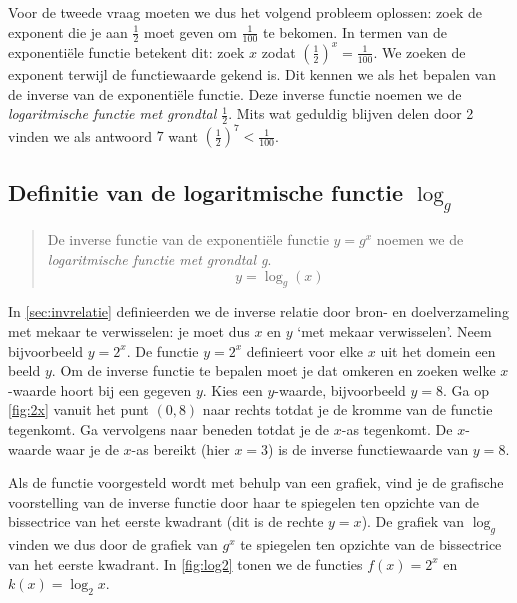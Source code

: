 Voor de  tweede vraag moeten we dus het volgend probleem oplossen: zoek de
exponent die je aan $\frac{1}{2}$ moet geven om $\frac{1}{100}$ te
bekomen. In termen van de exponenti\"{e}le functie betekent dit:
zoek $x$ zodat $\left(\frac{1}{2}\right)^{x}=\frac{1}{100}$. We zoeken de exponent terwijl de functiewaarde gekend is. Dit
kennen we als het bepalen van de inverse van de exponenti\"{e}le functie. Deze inverse
functie noemen we de \emph{logaritmische functie met grondtal
$\frac{1}{2}$}. Mits wat geduldig blijven delen door 2 vinden we als
antwoord $7$ want $\left(\frac{1}{2}\right)^{7}<\frac{1}{100}$.

\subsection[Definitie van de logaritmische functie $\log_{g}$]
{Definitie van de logaritmische functie
\boldmath$\log_{g}$\unboldmath}
\begin{quote}
   De inverse functie  van de exponenti\"ele 
functie $y=g^{x}$ noemen we de \emph{logaritmische functie met grondtal g}.
\[
y=\log_{g}(x)
\]
\end{quote}
In \cref{sec:invrelatie} definieerden we de inverse relatie door bron- en doelverzameling met mekaar te verwisselen: je moet dus $x$ en $y$ `met mekaar verwisselen'. 
Neem bijvoorbeeld $y=2^x$. De functie $y=2^x$ definieert voor elke $x$ uit het domein een beeld $y$. Om de inverse functie te bepalen moet je dat omkeren en zoeken welke $x$-waarde hoort bij een gegeven $y$. Kies een $y$-waarde, bijvoorbeeld $y=8$. Ga op \cref{fig:2x} vanuit het punt $(0,8)$ naar rechts totdat je de kromme van de functie tegenkomt. Ga vervolgens naar beneden totdat je de $x$-as tegenkomt. De $x$-waarde waar je de $x$-as bereikt (hier $x=3$) is de inverse functiewaarde van $y=8$. 

Als de functie voorgesteld wordt met behulp van een grafiek, vind je de grafische voorstelling van de inverse functie door haar te spiegelen ten opzichte van de bissectrice van het eerste kwadrant (dit is de rechte $y=x$).  De grafiek van $\log_{g}$ vinden we dus door de grafiek van $g^{x}$ te spiegelen ten opzichte van de bissectrice van het
eerste kwadrant. In \cref{fig:log2} tonen we de functies $f(x)=2^x$ en $k(x)=\log_2x$.

